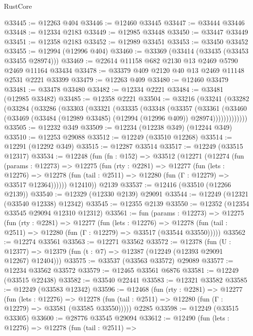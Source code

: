 \begin{lexlean}{RustCore}
\begin{coremodule}
@33445 := @12263 @404
@33446 := @12460 @33445
@33447 := @33444 @33446
@33448 := @12334 @2183
@33449 := @12985 @33448
@33450 := @33447 @33449
@33451 := @12358 @2183
@33452 := @12989 @33451
@33453 := @33450 @33452
@33455 := @12994 (@12996 @404)
@33460 := @33369 (@33414 (@33435 (@33453 @33455 @28974)))
@33469 := @22614 @11158 @682 @2130 @13 @2469 @5790 @2469 @11164 @33434
@33478 := @33379 @409 @2120 @40 @13 @2469 @11148 @2531 @2221 @33399
@33479 := @12263 @409
@33480 := @12460 @33479
@33481 := @33478 @33480
@33482 := @12334 @2221
@33484 := @33481 (@12985 @33482)
@33485 := @12358 @2221
@33504 := @33216
    (@33241
      (@33282
        (@33284
          (@33286
            (@33303
              (@33321
                (@33335
                  (@33348
                    (@33357
                      (@33361
                        (@33460
                          (@33469 (@33484 (@12989 @33485) (@12994 (@12996 @409)) @28974)))))))))))))
@33505 := @12232 @349
@33509 := @12234 (@12238 @349) (@12244 @349)
@33510 := @12253 @29088
@33512 := @12249 (@33510 @12268)
@33514 := @12291 (@12292 @349)
@33515 := @12287 @33514
@33517 := @12249 (@33515 @12317)
@33534 := @12248
    (fun (fn : @152) =>
    @33512
      (@12271
        (@12274
          (fun (params : @12273) =>
          @12275
            (fun (rty : @2281) =>
            @12277
              (fun (lets : @12276) =>
              @12278 (fun (tail : @2511) => @12280 (fun (Γ : @12279) => @33517 @12364))))))
        @12410))
    @2139
@33537 := @12416 (@33510 (@12266 @2139))
@33540 := @12329 (@12330 @2139) @29091
@33544 := @12249 (@12321 (@33540 @12338) @12342)
@33545 := @12355 @2139
@33550 := @12352 (@12354 @33545 @29094 @12310 @12312)
@33561 := fun (params : @12273) =>
  @12275
    (fun (rty : @2281) =>
    @12277
      (fun (lets : @12276) =>
      @12278 (fun (tail : @2511) => @12280 (fun (Γ : @12279) => @33517 (@33544 @33550)))))
@33562 := @12274 @33561
@33563 := @12271 @33562
@33572 := @12378
    (fun (U : @12377) => @12379 (fun (t : @7) => @12387 (@12249 (@12393 @29091 @12267) @12404)))
@33575 := @33537 (@33563 @33572) @29089
@33577 := @12234 @33562 @33572
@33579 := @12465 @33561 @6876
@33581 := @12249 (@33515 @22438)
@33582 := @33540 @22441
@33583 := @12321 @33582
@33585 := @12249 (@33583 @12342)
@33596 := @12468
    (fun (rty : @2281) =>
    @12277
      (fun (lets : @12276) =>
      @12278 (fun (tail : @2511) => @12280 (fun (Γ : @12279) => @33581 (@33585 @33550)))))
    @2285
@33598 := @12249 (@33515 @33305)
@33600 := @28776 @33545 @29094
@33612 := @12490
    (fun (lets : @12276) =>
    @12278
      (fun (tail : @2511) =>

\end{coremodule}
\end{lexlean}
